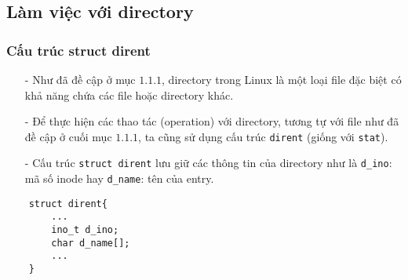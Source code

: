\documentclass{article}
\begin{document}
\subsection{Làm việc với directory}
\subsubsection{Cấu trúc struct dirent}
\begin{itemize}
    \item[-] Như đã đề cập ở mục $1.1.1$, directory trong Linux là một loại file đặc biệt có khả năng chứa các file hoặc directory khác.
    \item[-] Để thực hiện các thao tác (operation) với directory, tương tự với file như đã đề cập ở cuối mục $1.1.1$, ta cũng sử dụng cấu trúc \verb|dirent| (giống với \verb|stat|). 
    \item[-] Cấu trúc \verb|struct dirent| lưu giữ các thông tin của directory như là \verb|d_ino|: mã số inode hay \verb|d_name|: tên của entry.
\end{itemize}
\begin{verbatim}
    struct dirent{
        ...
        ino_t d_ino;
        char d_name[];
        ...
    }
\end{verbatim}
\end{document}
